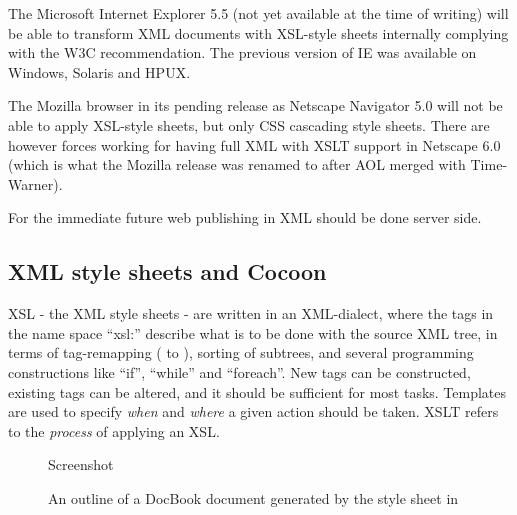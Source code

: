 The Microsoft Internet Explorer 5.5 (not yet available at the time of
writing) will be able to transform XML documents with XSL-style sheets
internally complying with the W3C recommendation.  The previous
version of IE was available on Windows, Solaris and HPUX.

The Mozilla browser in its pending release as Netscape Navigator 5.0
will not be able to apply XSL-style sheets, but only CSS cascading
style sheets.  There are however forces working for having full XML
with XSLT support in Netscape 6.0 (which is what the Mozilla release
was renamed to after AOL merged with Time-Warner).

For the immediate future web publishing in XML should be done server side.


%
%
%
%
%

\subsection{XML style sheets and Cocoon}

XSL - the XML style sheets - are written in an XML-dialect, where the
tags in the name space ``xsl:'' describe what is to be done with the
source XML tree, in terms of tag-remapping ( to ),
sorting of subtrees, and several programming constructions like
``if'', ``while'' and ``foreach''.  New tags can be constructed,
existing tags can be altered, and it should be sufficient for most
tasks.  Templates are used to specify \textit{when} and \textit{where}
a given action should be taken.   XSLT refers to the \textit{process}
of applying an XSL.


% 

\begin{figure}[htbp]
  \begin{center}
    \textsf{Screenshot}
    \caption{An outline of a DocBook document generated by \textsf{the style sheet} in }
  \label{fig:screenshot-x-outline.xsl}
\end{center}
\end{figure}

